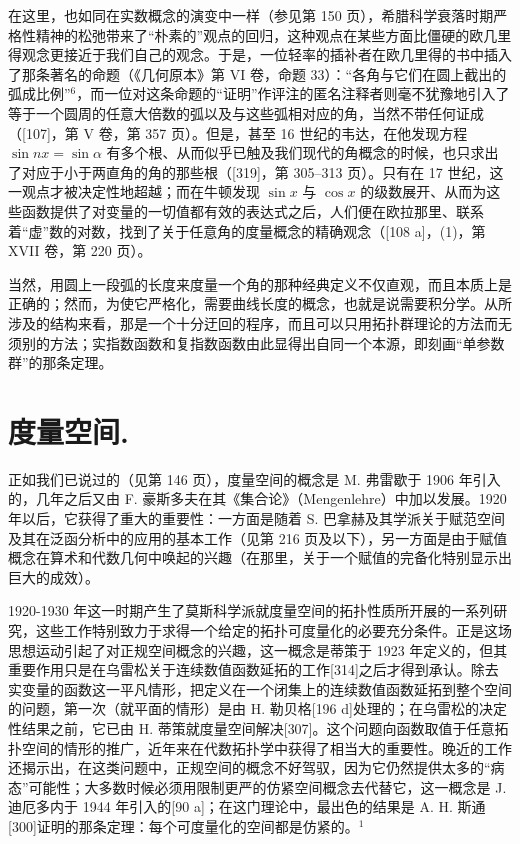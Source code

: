 在这里，也如同在实数概念的演变中一样（参见第 150 页），希腊科学衰落时期严格性精神的松弛带来了“朴素的”观点的回归，这种观点在某些方面比僵硬的欧几里得观念更接近于我们自己的观念。于是，一位轻率的插补者在欧几里得的书中插入了那条著名的命题（《几何原本》第 VI 卷，命题 33）：“各角与它们在圆上截出的弧成比例”\(^{6}\)，而一位对这条命题的“证明”作评注的匿名注释者则毫不犹豫地引入了等于一个圆周的任意大倍数的弧以及与这些弧相对应的角，当然不带任何证成（{[}107{]}，第 V 卷，第 357 页）。但是，甚至 16 世纪的韦达，在他发现方程 \(\sin nx = \sin \alpha\) 有多个根、从而似乎已触及我们现代的角概念的时候，也只求出了对应于小于两直角的角的那些根（{[}319{]}，第 305–313 页）。只有在 17 世纪，这一观点才被决定性地超越；而在牛顿发现 \(\sin x\) 与 \(\cos x\) 的级数展开、从而为这些函数提供了对变量的一切值都有效的表达式之后，人们便在欧拉那里、联系着“虚”数的对数，找到了关于任意角的度量概念的精确观念（{[}108 a{]}，(1)，第 XVII 卷，第 220 页）。

当然，用圆上一段弧的长度来度量一个角的那种经典定义不仅直观，而且本质上是正确的；然而，为使它严格化，需要曲线长度的概念，也就是说需要积分学。从所涉及的结构来看，那是一个十分迂回的程序，而且可以只用拓扑群理论的方法而无须别的方法；实指数函数和复指数函数由此显得出自同一个本源，即刻画“单参数群”的那条定理。

\chapter{度量空间.}

正如我们已说过的（见第 146 页），度量空间的概念是 M. 弗雷歇于 1906 年引入的，几年之后又由 F. 豪斯多夫在其《集合论》（Mengenlehre）中加以发展。1920 年以后，它获得了重大的重要性：一方面是随着 S. 巴拿赫及其学派关于赋范空间及其在泛函分析中的应用的基本工作（见第 216 页及以下），另一方面是由于赋值概念在算术和代数几何中唤起的兴趣（在那里，关于一个赋值的完备化特别显示出巨大的成效）。

1920-1930 年这一时期产生了莫斯科学派就度量空间的拓扑性质所开展的一系列研究，这些工作特别致力于求得一个给定的拓扑可度量化的必要充分条件。正是这场思想运动引起了对正规空间概念的兴趣，这一概念是蒂策于 1923 年定义的，但其重要作用只是在乌雷松关于连续数值函数延拓的工作{[}314{]}之后才得到承认。除去实变量的函数这一平凡情形，把定义在一个闭集上的连续数值函数延拓到整个空间的问题，第一次（就平面的情形）是由 H. 勒贝格{[}196 d{]}处理的；在乌雷松的决定性结果之前，它已由 H. 蒂策就度量空间解决{[}307{]}。这个问题向函数取值于任意拓扑空间的情形的推广，近年来在代数拓扑学中获得了相当大的重要性。晚近的工作还揭示出，在这类问题中，正规空间的概念不好驾驭，因为它仍然提供太多的“病态”可能性；大多数时候必须用限制更严的仿紧空间概念去代替它，这一概念是 J. 迪厄多内于 1944 年引入的{[}90 a{]}；在这门理论中，最出色的结果是 A. H. 斯通{[}300{]}证明的那条定理：每个可度量化的空间都是仿紧的。\(^{1}\)

